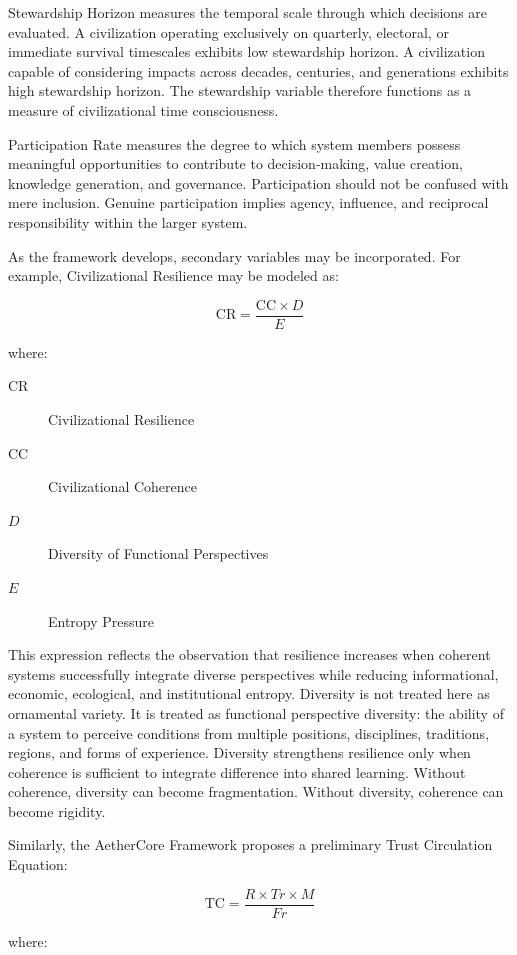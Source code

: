 \documentclass[12pt]{article}
\begin{document}
Stewardship Horizon measures the temporal scale through which decisions are evaluated. A civilization operating exclusively on quarterly, electoral, or immediate survival timescales exhibits low stewardship horizon. A civilization capable of considering impacts across decades, centuries, and generations exhibits high stewardship horizon. The stewardship variable therefore functions as a measure of civilizational time consciousness.

Participation Rate measures the degree to which system members possess meaningful opportunities to contribute to decision-making, value creation, knowledge generation, and governance. Participation should not be confused with mere inclusion. Genuine participation implies agency, influence, and reciprocal responsibility within the larger system.

As the framework develops, secondary variables may be incorporated. For example, Civilizational Resilience may be modeled as:

\[
\mathrm{CR}=\frac{\mathrm{CC}\times D}{E}
\]

where:

\begin{description}
  \item[\(\mathrm{CR}\)] Civilizational Resilience
  \item[\(\mathrm{CC}\)] Civilizational Coherence
  \item[\(D\)] Diversity of Functional Perspectives
  \item[\(E\)] Entropy Pressure
\end{description}

This expression reflects the observation that resilience increases when coherent systems successfully integrate diverse perspectives while reducing informational, economic, ecological, and institutional entropy. Diversity is not treated here as ornamental variety. It is treated as functional perspective diversity: the ability of a system to perceive conditions from multiple positions, disciplines, traditions, regions, and forms of experience. Diversity strengthens resilience only when coherence is sufficient to integrate difference into shared learning. Without coherence, diversity can become fragmentation. Without diversity, coherence can become rigidity.

Similarly, the AetherCore Framework proposes a preliminary Trust Circulation Equation:

\[
\mathrm{TC}=\frac{R\times Tr\times M}{Fr}
\]

where:
\end{document}

